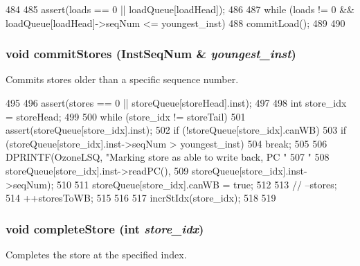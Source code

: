 \begin{DoxyCode}
484 {
485     assert(loads == 0 || loadQueue[loadHead]);
486 
487     while (loads != 0 && loadQueue[loadHead]->seqNum <= youngest_inst) {
488         commitLoad();
489     }
490 }
\end{DoxyCode}
\hypertarget{classOzoneLSQ_a954ce1ce58b67cae49ba127d5ea40701}{
\subsubsection[{commitStores}]{\setlength{\rightskip}{0pt plus 5cm}void commitStores ({\bf InstSeqNum} \& {\em youngest\_\-inst})}}
\label{classOzoneLSQ_a954ce1ce58b67cae49ba127d5ea40701}
Commits stores older than a specific sequence number. 


\begin{DoxyCode}
495 {
496     assert(stores == 0 || storeQueue[storeHead].inst);
497 
498     int store_idx = storeHead;
499 
500     while (store_idx != storeTail) {
501         assert(storeQueue[store_idx].inst);
502         if (!storeQueue[store_idx].canWB) {
503             if (storeQueue[store_idx].inst->seqNum > youngest_inst) {
504                 break;
505             }
506             DPRINTF(OzoneLSQ, "Marking store as able to write back, PC "
507                     "%
508                     storeQueue[store_idx].inst->readPC(),
509                     storeQueue[store_idx].inst->seqNum);
510 
511             storeQueue[store_idx].canWB = true;
512 
513 //            --stores;
514             ++storesToWB;
515         }
516 
517         incrStIdx(store_idx);
518     }
519 }
\end{DoxyCode}
\hypertarget{classOzoneLSQ_a12ec7cad6ac51a53bca7795588885e5c}{
\subsubsection[{completeStore}]{\setlength{\rightskip}{0pt plus 5cm}void completeStore (int {\em store\_\-idx})}}
\label{classOzoneLSQ_a12ec7cad6ac51a53bca7795588885e5c}
Completes the store at the specified index. 


